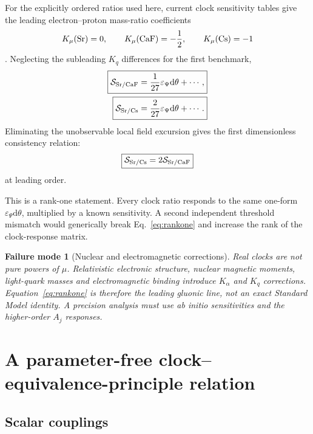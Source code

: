 \documentclass[11pt,a4paper]{article}
\newtheorem{failure}[definition]{Failure mode}
\newcommand{\dd}{\mathrm{d}}
\begin{document}
For the explicitly ordered ratios used here, current clock sensitivity tables give the leading electron--proton mass-ratio coefficients
\[
K_\mu({\rm Sr})=0,
\qquad
K_\mu({\rm CaF})=-\frac12,
\qquad
K_\mu({\rm Cs})=-1
\]
\cite{Elder2025}. Neglecting the subleading $K_q$ differences for the first benchmark,
\begin{align}
\boxed{
\mathcal S_{\rm Sr/CaF}
=\frac{1}{27}\varepsilon_\Psi\dd\theta+\cdots,
}
\label{eq:srcaf}\\
\boxed{
\mathcal S_{\rm Sr/Cs}
=\frac{2}{27}\varepsilon_\Psi\dd\theta+\cdots.
}
\label{eq:srcs}
\end{align}
Eliminating the unobservable local field excursion gives the first dimensionless consistency relation:
\[
\boxed{
\mathcal S_{\rm Sr/Cs}
=2\mathcal S_{\rm Sr/CaF}
}
\label{eq:rankone}
\]
at leading order.

This is a rank-one statement. Every clock ratio responds to the same one-form $\varepsilon_\Psi\dd\theta$, multiplied by a known sensitivity. A second independent threshold mismatch would generically break Eq.~\eqref{eq:rankone} and increase the rank of the clock-response matrix.

\begin{failure}[Nuclear and electromagnetic corrections]
Real clocks are not pure powers of $\mu$. Relativistic electronic structure, nuclear magnetic moments, light-quark masses and electromagnetic binding introduce $K_\alpha$ and $K_q$ corrections. Equation~\eqref{eq:rankone} is therefore the leading gluonic line, not an exact Standard Model identity. A precision analysis must use ab initio sensitivities and the higher-order $A_j$ responses.
\end{failure}

\section{A parameter-free clock--equivalence-principle relation}
\label{sec:EP}

\subsection{Scalar couplings}
\end{document}
